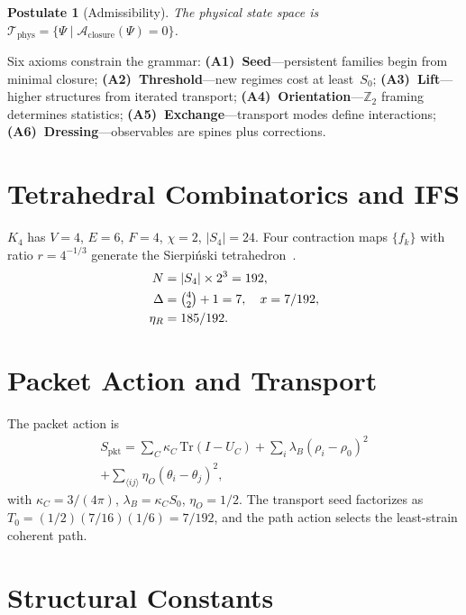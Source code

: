 \documentclass[11pt,twocolumn]{article}
\newtheorem{postulate}{Postulate}
\begin{document}
\begin{postulate}[Admissibility]
The physical state space is $\mathcal{T}_{\mathrm{phys}}=\{\Psi\mid\mathcal{A}_{\mathrm{closure}}(\Psi)=0\}$.
\end{postulate}

Six axioms constrain the grammar:
\textbf{(A1)~Seed}---persistent families begin from minimal closure;
\textbf{(A2)~Threshold}---new regimes cost at least~$S_0$;
\textbf{(A3)~Lift}---higher structures from iterated transport;
\textbf{(A4)~Orientation}---$\mathbb{Z}_2$ framing determines statistics;
\textbf{(A5)~Exchange}---transport modes define interactions;
\textbf{(A6)~Dressing}---observables are spines plus corrections.

\section{Tetrahedral Combinatorics and IFS}
\label{sec:K4}

$K_4$ has $V{=}4$, $E{=}6$, $F{=}4$, $\chi{=}2$, $|S_4|{=}24$.
Four contraction maps $\{f_k\}$ with ratio $r=4^{-1/3}$ generate the Sierpi\'nski tetrahedron~\cite{hutchinson1981}.
\begin{align}
N &= |S_4|\times 2^3 = 192,\label{eq:N}\\
\Delta &= \tbinom{4}{2}+1 = 7,\quad x = 7/192,\label{eq:x}\\
\eta_R &= 185/192.\label{eq:eta}
\end{align}

\section{Packet Action and Transport}
\label{sec:action}

The packet action is
\begin{multline}
S_{\mathrm{pkt}} = \sum_C \kappa_C\,\mathrm{Tr}(I{-}U_C) + \sum_i \lambda_B(\rho_i{-}\rho_0)^2\\
+ \sum_{\langle ij\rangle}\eta_O(\theta_i{-}\theta_j)^2,
\label{eq:Spkt}
\end{multline}
with $\kappa_C=3/(4\pi)$, $\lambda_B=\kappa_C S_0$, $\eta_O=1/2$.
The transport seed factorizes as $T_0=(1/2)(7/16)(1/6)=7/192$, and the path action selects the least-strain coherent path.


\section{Structural Constants}
\label{sec:constants}
\end{document}
